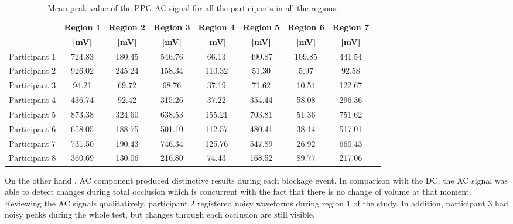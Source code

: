 \begin{table}[!htbp]
	\caption[Mean peak value of the PPG AC signal for all participants in all regions]{Mean peak value of the PPG AC signal for all the participants in all the regions.}
	\label{tbl:PPG RED AC}
	\centering \small
	\begin{tabular}{lcccccccc}
		\toprule
		& \textbf{Region 1}
		& \textbf{Region 2}
		& \textbf{Region 3}
		& \textbf{Region 4}
		& \textbf{Region 5}
		& \textbf{Region 6}
		& \textbf{Region 7} \\
		& \textbf{[\si{\milli\volt}]}
		& \textbf{[\si{\milli\volt}]}
		& \textbf{[\si{\milli\volt}]}		
		& \textbf{[\si{\milli\volt}]}		
		& \textbf{[\si{\milli\volt}]}
		& \textbf{[\si{\milli\volt}]}
		& \textbf{[\si{\milli\volt}]}\\\midrule
		Participant 1    &     724.83    &     180.45    &     546.76    &      66.13    &     490.87    &     109.85    &     441.54    \\  
		Participant 2    &     926.02    &     245.24    &     158.34    &     110.32    &      51.30    &       5.97    &      92.58    \\  
		Participant 3    &      94.21    &      69.72    &      68.76    &      37.19    &      71.62    &      10.54    &     122.67    \\  
		Participant 4    &     436.74    &      92.42    &     315.26    &      37.22    &     354.44    &      58.08    &     296.36    \\  
		Participant 5    &     873.38    &     324.60    &     638.53    &     155.21    &     703.81    &      51.36    &     751.62    \\  
		Participant 6    &     658.05    &     188.75    &     501.10    &     112.57    &     480.41    &      38.14    &     517.01    \\  
		Participant 7    &     731.50    &     190.43    &     746.34    &     125.76    &     547.89    &      26.92    &     660.43    \\  
		Participant 8    &     360.69    &     130.06    &     216.80    &      74.43    &     168.52    &      89.77    &     217.06    \\ 
		\bottomrule
	\end{tabular}
\end{table}

On the other hand , AC component produced distinctive results during each blockage event. In comparison with the DC, the AC signal was able to detect changes during total occlusion which is concurrent with the fact that there is no change of volume at that moment. Reviewing the AC signals qualitatively, participant 2 registered noisy waveforms during region 1 of the study. In addition, participant 3 had noisy peaks during the whole test, but changes through each occlusion are still visible.

